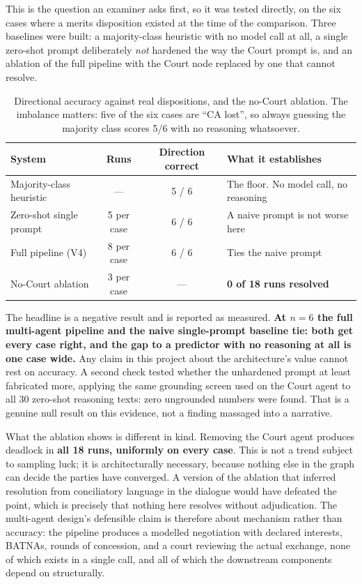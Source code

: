 This is the question an examiner asks first, so it was tested directly, on the six
cases where a merits disposition existed at the time of the comparison. Three
baselines were built: a majority-class heuristic with no model call at all, a
single zero-shot prompt deliberately \emph{not} hardened the way the Court prompt
is, and an ablation of the full pipeline with the Court node replaced by one that
cannot resolve.

\begin{table}[htbp]
\centering
\footnotesize
\caption[Baseline comparison]{Directional accuracy against real dispositions, and
the no-Court ablation. The imbalance matters: five of the six cases are ``CA
lost'', so always guessing the majority class scores 5/6 with no reasoning
whatsoever.}
\label{tab:baselines}
\begin{tabular}{@{}lccl@{}}
\toprule
\textbf{System} & \textbf{Runs} & \textbf{Direction correct} & \textbf{What it establishes} \\
\midrule
Majority-class heuristic & --- & 5 / 6 & The floor. No model call, no reasoning \\
Zero-shot single prompt & 5 per case & 6 / 6 & A naive prompt is not worse here \\
Full pipeline (V4) & 8 per case & 6 / 6 & Ties the naive prompt \\
No-Court ablation & 3 per case & --- & \textbf{0 of 18 runs resolved} \\
\bottomrule
\end{tabular}
\end{table}

The headline is a negative result and is reported as measured.
\textbf{At $n=6$ the full multi-agent pipeline and the naive single-prompt
baseline tie: both get every case right, and the gap to a predictor with no
reasoning at all is one case wide.} Any claim in this project about the
architecture's value cannot rest on accuracy. A second check tested whether the
unhardened prompt at least fabricated more, applying the same grounding screen
used on the Court agent to all 30 zero-shot reasoning texts: zero ungrounded
numbers were found. That is a genuine null result on this evidence, not a finding
massaged into a narrative.

What the ablation shows is different in kind. Removing the Court agent produces
deadlock in \textbf{all 18 runs, uniformly on every case}. This is not a trend
subject to sampling luck; it is architecturally necessary, because nothing else in
the graph can decide the parties have converged. A version of the ablation that
inferred resolution from conciliatory language in the dialogue would have defeated
the point, which is precisely that nothing here resolves without adjudication.
The multi-agent design's defensible claim is therefore about mechanism rather than
accuracy: the pipeline produces a modelled negotiation with declared interests,
BATNAs, rounds of concession, and a court reviewing the actual exchange, none of
which exists in a single call, and all of which the downstream components depend
on structurally.

